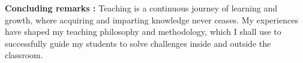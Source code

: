 \documentclass[11pt,a4paper,times]{moderncv} %
\begin{document}
\textbf{Concluding remarks : } Teaching is a continuous journey of learning and growth, where acquiring and imparting knowledge never ceases. My experiences have shaped my teaching philosophy and methodology, which I shall use to successfully guide my students to solve challenges inside and outside the classroom.


\end{document}
